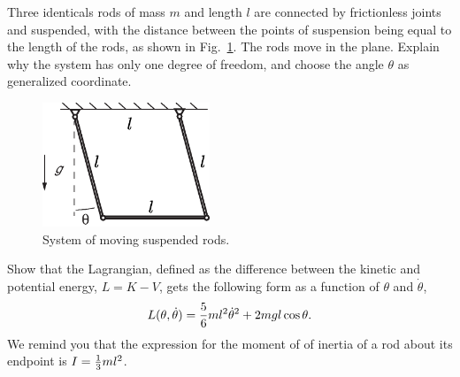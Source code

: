 \documentclass[11pt,a4paper]{report}
\newcounter{excount}[chapter]
\newenvironment{exercise}[1][]{\addtocounter{excount}{1} \noindent {\bf Problem
    \arabic{excount} \ \ #1}\hspace{2mm}}{\vspace{4mm}}
\begin{document}
\newpage
\begin{exercise}
Three identicals rods of mass $m$ and length $l$ are connected by frictionless joints and suspended,  with the distance between the points of suspension being equal to the length of the rods, as shown in Fig.~\ref{fig:rods}. The rods move in the plane. Explain why the system has only one degree of freedom, and choose the angle $\theta$ as generalized coordinate.

\begin{figure}[h!]
\begin{center}
\includegraphics[width=5cm]{ThreeRods.eps}
\end{center}
\caption{System of moving suspended rods.}
\label{fig:rods}
\end{figure}

Show that the Lagrangian, defined as the difference between the kinetic and potential energy, $L=K-V$, gets the following form as a function of $\theta$ and $\dot\theta$,
\begin{equation}
L(\theta,\dot\theta)={5\over 6}m l^2\dot\theta^2+2mgl\cos\theta.
\end{equation}
We remind you that the expression for the moment of of inertia of a rod about its endpoint is $I={1\over 3}m l^2$.
\end{exercise}
\end{document}
